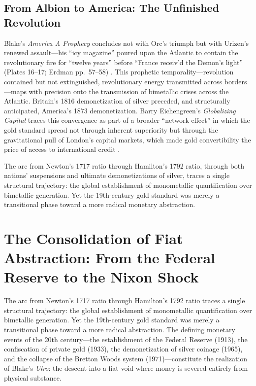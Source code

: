 \documentclass[
]{article}
\begin{document}
\subsection{From Albion to America: The Unfinished
Revolution}\label{from-albion-to-america-the-unfinished-revolution}

Blake's \emph{America A Prophecy} concludes not with Orc's triumph but
with Urizen's renewed assault---his ``icy magazine'' poured upon the
Atlantic to contain the revolutionary fire for ``twelve years'' before
``France receiv'd the Demon's light'' (Plates 16--17; Erdman pp.~57--58)
\citep{erdman1988complete, blake1793america}. This prophetic
temporality---revolution contained but not extinguished, revolutionary
energy transmitted across borders---maps with precision onto the
transmission of bimetallic crises across the Atlantic. Britain's 1816
demonetization of silver preceded, and structurally anticipated,
America's 1873 demonetization. Barry Eichengreen's \emph{Globalizing
Capital} traces this convergence as part of a broader ``network effect''
in which the gold standard spread not through inherent superiority but
through the gravitational pull of London's capital markets, which made
gold convertibility the price of access to international credit
\citep{eichengreen2019globalizing}.

The arc from Newton's 1717 ratio through Hamilton's 1792 ratio, through
both nations' suspensions and ultimate demonetizations of silver, traces
a single structural trajectory: the global establishment of monometallic
quantification over bimetallic generation. Yet the 19th-century gold
standard was merely a transitional phase toward a more radical monetary
abstraction.

\newpage

\section{The Consolidation of Fiat Abstraction: From the Federal Reserve
to the Nixon
Shock}\label{the-consolidation-of-fiat-abstraction-from-the-federal-reserve-to-the-nixon-shock}

The arc from Newton's 1717 ratio through Hamilton's 1792 ratio traces a
single structural trajectory: the global establishment of monometallic
quantification over bimetallic generation. Yet the 19th-century gold
standard was merely a transitional phase toward a more radical
abstraction. The defining monetary events of the 20th century---the
establishment of the Federal Reserve (1913), the confiscation of private
gold (1933), the demonetization of silver coinage (1965), and the
collapse of the Bretton Woods system (1971)---constitute the realization
of Blake's \emph{Ulro}: the descent into a fiat void where money is
severed entirely from physical substance.
\end{document}
